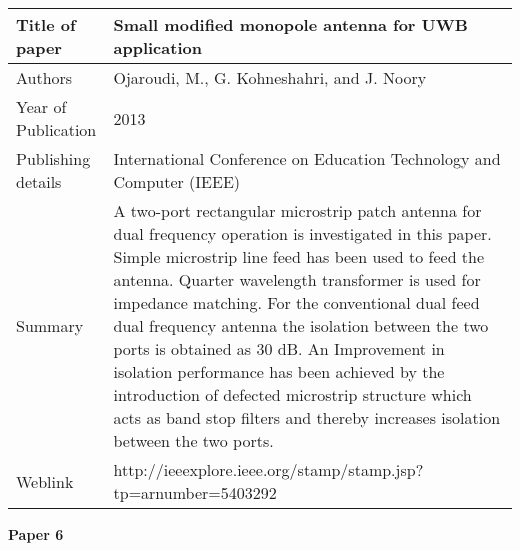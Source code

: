 	    	\begin{table}[h]
	    		\centering
	    		\begin{tabular}{ |l|p{11cm}| }
	    			\hline
	    			Title of paper & Small modified monopole antenna for UWB application \\
	    			\hline
	    			Authors & Ojaroudi, M., G. Kohneshahri, and J. Noory \\
	    			\hline
	    			Year of Publication & 2013 \\
	    			\hline
	    			Publishing details & International Conference on Education Technology and Computer (IEEE) \\ \hline
	    			Summary & A two-port rectangular microstrip patch antenna for dual frequency operation is investigated in this paper. Simple microstrip line feed has been used to feed the antenna. Quarter wavelength transformer is used for impedance matching. For the conventional dual feed dual frequency antenna the isolation between the two ports is obtained as 30 dB. An Improvement in isolation performance has been achieved by the introduction of defected microstrip structure which acts as band stop filters and thereby increases isolation between the two ports.\\
	    			\hline
	    			Weblink & http://ieeexplore.ieee.org/stamp/stamp.jsp?tp=arnumber=5403292 \\
	    			\hline
	    		\end{tabular}

	    	\end{table}
	    	
	    	\begin{flushleft}
	    		\textbf{Paper 6}
	    	\end{flushleft}
	    	


